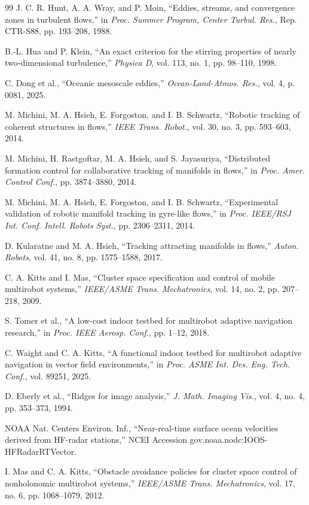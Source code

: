 \documentclass[lettersize,journal]{IEEEtran}
\begin{document}
\begin{thebibliography}{99}
 J. C. R. Hunt, A. A. Wray, and P. Moin, ``Eddies, streams, and
convergence zones in turbulent flows,'' in \textit{Proc. Summer Program,
Center Turbul. Res.}, Rep. CTR-S88, pp. 193--208, 1988.

 B.-L. Hua and P. Klein, ``An exact criterion for the stirring
properties of nearly two-dimensional turbulence,'' \textit{Physica D}, vol. 113,
no. 1, pp. 98--110, 1998.

 C. Dong et al., ``Oceanic mesoscale eddies,''
\textit{Ocean-Land-Atmos. Res.}, vol. 4, p. 0081, 2025.

 M. Michini, M. A. Hsieh, E. Forgoston, and I. B. Schwartz,
``Robotic tracking of coherent structures in flows,'' \textit{IEEE Trans.
Robot.}, vol. 30, no. 3, pp. 593--603, 2014.

 M. Michini, H. Rastgoftar, M. A. Hsieh, and S. Jayasuriya,
``Distributed formation control for collaborative tracking of manifolds in
flows,'' in \textit{Proc. Amer. Control Conf.}, pp. 3874--3880, 2014.

 M. Michini, M. A. Hsieh, E. Forgoston, and I. B. Schwartz,
``Experimental validation of robotic manifold tracking in gyre-like flows,''
in \textit{Proc. IEEE/RSJ Int. Conf. Intell. Robots Syst.},
pp. 2306--2311, 2014.

 D. Kularatne and M. A. Hsieh, ``Tracking attracting manifolds in
flows,'' \textit{Auton. Robots}, vol. 41, no. 8, pp. 1575--1588, 2017.

 C. A. Kitts and I. Mas, ``Cluster space specification and control
of mobile multirobot systems,'' \textit{IEEE/ASME Trans. Mechatronics},
vol. 14, no. 2, pp. 207--218, 2009.

 S. Tomer et al., ``A low-cost indoor testbed for multirobot
adaptive navigation research,'' in \textit{Proc. IEEE Aerosp. Conf.},
pp. 1--12, 2018.

 C. Waight and C. A. Kitts, ``A functional indoor testbed for
multirobot adaptive navigation in vector field environments,'' in
\textit{Proc. ASME Int. Des. Eng. Tech. Conf.}, vol. 89251, 2025.

 D. Eberly et al., ``Ridges for image analysis,''
\textit{J. Math. Imaging Vis.}, vol. 4, no. 4, pp. 353--373, 1994.

 NOAA Nat. Centers Environ. Inf., ``Near-real-time surface
ocean velocities derived from HF-radar stations,'' NCEI Accession
gov.noaa.nodc:IOOS-HFRadarRTVector.

 I. Mas and C. A. Kitts, ``Obstacle avoidance policies for cluster
space control of nonholonomic multirobot systems,'' \textit{IEEE/ASME Trans.
Mechatronics}, vol. 17, no. 6, pp. 1068--1079, 2012.

\end{thebibliography}
\end{document}
